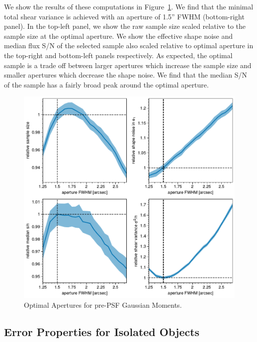 \documentclass[twocolappendix, appendixfloats, numberedappendix, twocolumn, apj]{openjournal}
\begin{document}
We show the results of these computations in Figure~\ref{fig:opap}. We find that the
minimal total shear variance is achieved with an aperture of 1.5'' FWHM (bottom-right panel).
In the top-left panel, we show the raw sample size scaled relative to the sample
size at the optimal aperture. We show the effective shape noise and median flux S/N of
the selected sample also scaled relative to optimal aperture in the top-right and
bottom-left panels respectively. As expected, the optimal sample is a trade off between
larger apertures which increase the sample size and smaller apertures which decrease
the shape noise. We find that the median S/N of the sample has a fairly broad peak
around the optimal aperture.

\begin{figure}
  \centering
  \includegraphics[width=2\columnwidth]{figures/optap.pdf}

  \caption{Optimal Apertures for pre-PSF Gaussian Moments.
  \label{fig:opap}}

\end{figure}


\subsection{Error Properties for Isolated Objects}
\end{document}
